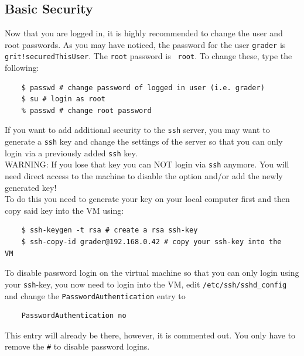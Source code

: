 \documentclass[10pt,a4paper, titlepage, toc=idx]{scrreprt}
\theoremstyle{definition}
\theoremstyle{plain}
\begin{document}
	\subsection{Basic Security}
	Now that you are logged in, it is highly recommended to change
        the user and root passwords. As you may have noticed, the
        password for the user {\tt grader} is {\tt
          grit!securedThisUser}. The {\tt root} password is {\tt
          root}. To change these, type the following:
\begin{lstlisting}
	$ passwd # change password of logged in user (i.e. grader)
	$ su # login as root
	% passwd # change root password
\end{lstlisting}
	If you want to add additional security to the {\tt ssh}
        server, you may want to generate a {\tt ssh} key and change
        the settings of the
	server so that you can only login via a previously added {\tt ssh} key.\\
	{\color{red} WARNING: If you lose that key you can NOT login
          via {\tt ssh} anymore. You will need direct access to the
          machine to
          disable the option and/or add the newly generated key!}\\
	To do this you need to generate your key on your local
        computer first and then copy said key into the VM using:
\begin{lstlisting}
	$ ssh-keygen -t rsa # create a rsa ssh-key
	$ ssh-copy-id grader@192.168.0.42 # copy your ssh-key into the
VM
\end{lstlisting}
	To disable password login on the virtual machine so that you
        can only login using your {\tt ssh}-key, you now need to login
        into the VM, edit {\tt /etc/ssh/sshd\_config} and change the
        {\tt PasswordAuthentication} entry to
\begin{lstlisting}
	PasswordAuthentication no
\end{lstlisting}
	This entry will already be there, however, it is commented
        out. You only have to remove the {\tt\#} to disable password
        logins.
\end{document}
